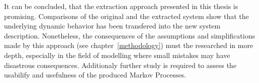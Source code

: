 It can be concluded, that the extraction approach presented in this thesis is promising. Comparisons of the original and the extracted system show that the underlying dynamic behavior has been transfered into the new system description. Nonetheless, the consequences of the assumptions and simplifications made by this approach (see chapter~\ref{methodology}) must the researched in more depth, especially in the field of modelling where small mistakes may have disastrous consequences. Additionaly further study is required to assess the usabilify and usefulness of the produced Markov Processes.





